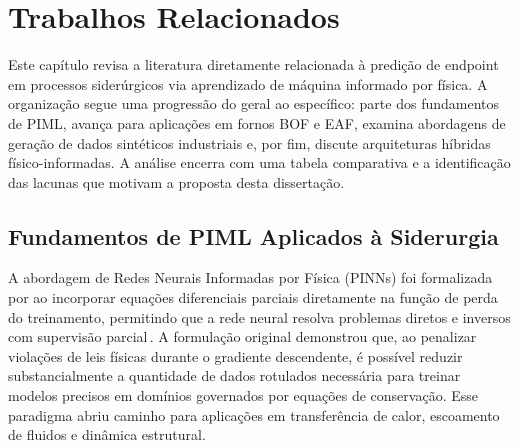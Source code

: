 \chapter{Trabalhos Relacionados}
\label{chp:capitulo3}

Este capítulo revisa a literatura diretamente relacionada à predição de endpoint em processos siderúrgicos via aprendizado de máquina informado por física. A organização segue uma progressão do geral ao específico: parte dos fundamentos de PIML, avança para aplicações em fornos BOF e EAF, examina abordagens de geração de dados sintéticos industriais e, por fim, discute arquiteturas híbridas físico-informadas. A análise encerra com uma tabela comparativa e a identificação das lacunas que motivam a proposta desta dissertação.

\section{Fundamentos de PIML Aplicados à Siderurgia}
\label{sec:piml-fundamentos}

A abordagem de Redes Neurais Informadas por Física (PINNs) foi formalizada por \citeauthor{raissi2019pinns} ao incorporar equações diferenciais parciais diretamente na função de perda do treinamento, permitindo que a rede neural resolva problemas diretos e inversos com supervisão parcial\,\cite{raissi2019pinns}. A formulação original demonstrou que, ao penalizar violações de leis físicas durante o gradiente descendente, é possível reduzir substancialmente a quantidade de dados rotulados necessária para treinar modelos precisos em domínios governados por equações de conservação. Esse paradigma abriu caminho para aplicações em transferência de calor, escoamento de fluidos e dinâmica estrutural.

